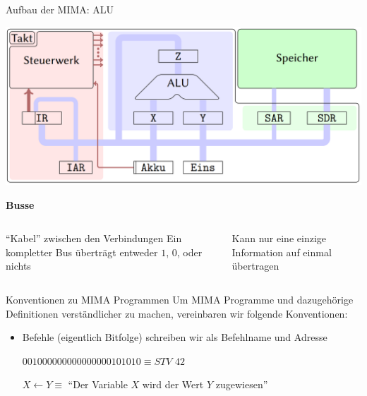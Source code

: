 \begin{frame}{Aufbau der MIMA: ALU}
\begin{center}\includegraphics[width=.6\textwidth]{images/mima_aufbau.png}\end{center}

\bp

\textbf{Busse}

\begin{columns}
	\begin{column}{0.5\textwidth}
		\begin{itemize}
			\pitem ``Kabel'' zwischen den Verbindungen
			\pitem Ein kompletter Bus überträgt entweder $1$, $0$, oder nichts
		\end{itemize}
	\end{column}
	
	\begin{column}{0.5\textwidth}
		\begin{itemize}
			\pitem Kann nur eine einzige Information auf einmal übertragen
		\end{itemize}
	\end{column}
\end{columns}

\end{frame}

\begin{frame}{Konventionen zu MIMA Programmen}
	Um MIMA Programme und dazugehörige Definitionen verständlicher zu machen, vereinbaren wir folgende Konventionen:
	
	\bp
	
	\begin{itemize}
		\item Befehle (eigentlich Bitfolge) schreiben wir als Befehlname und Adresse
		\begin{itemize}
			\pitem $001000000000000000101010 \equiv STV$ $42$
		\end{itemize}
		\pitem $X \leftarrow Y \equiv $ ``Der Variable $X$ wird der Wert $Y$ zugewiesen''
		
	\end{itemize}
	
	
\end{frame}


